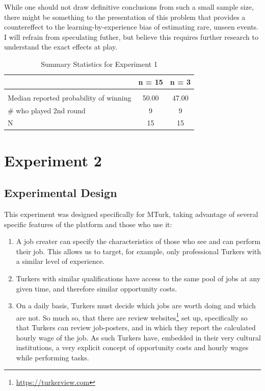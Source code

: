 \documentclass[a4paper,12pt]{article}
\begin{document}
While one should not draw definitive conclusions from such a small sample size, there might be something to the presentation of this problem that provides a countereffect to the learning-by-experience bias of estimating rare, unseen events. I will refrain from speculating futher, but believe this requires further research to understand the exact effects at play.

\begin{table}
  \caption{Summary Statistics for Experiment 1}
  \label{table:descriptive-1}
  \begin{center}
    \begin{tabular}{lcc}
      \hline
      & n = 15 & n = 3  \\
      \hline
      \hline \\ [-1.8ex]
      Median reported probability of winning &  50.00 & 47.00  \\
      \# who played 2nd round                 &   9 &  9  \\
      N                                  &   15 &  15  \\
      \hline
    \end{tabular}
  \end{center}
\end{table}

\section{ Experiment 2 }

\subsection{ Experimental Design }

This experiment was designed specifically for MTurk, taking advantage of several specific features of the platform and those who use it:

\begin{enumerate}
\item A job creater can specify the characteristics of those who see and can perform their job. This allows us to target, for example, only professional Turkers with a similar level of experience.
\item Turkers with similar qualifications have access to the same pool of jobs at any given time, and therefore similar opportunity costs.
\item On a daily basis, Turkers must decide which jobs are worth doing and which are not. So much so, that there are review websites\footnote{\url{https://turkerview.com}} set up, specifically so that Turkers can review job-posters, and in which they report the calculated hourly wage of the job. As such Turkers have, embedded in their very cultural institutions, a very explicit concept of opportunity costs and hourly wages while performing tasks.
\end{enumerate}
\end{document}
